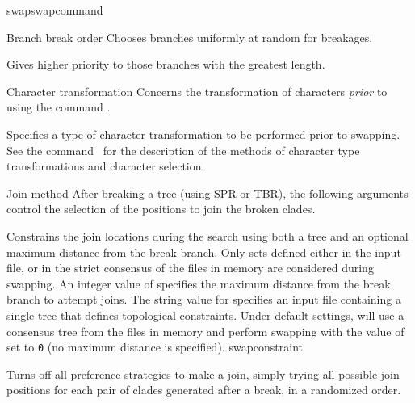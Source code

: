 \begin{command}{swap}{swapcommand}
\begin{arguments}
\begin{argumentgroup}{Branch break order}
                {Chooses branches uniformly at random for breakages.}
                {}

                {Gives higher priority to those branches with the greatest length.}
                {}

        \end{argumentgroup}


        \begin{argumentgroup}{Character transformation} 
        {Concerns the transformation of characters \emph{prior} to using the command 
        .}
	    
                {Specifies a type of character transformation to be performed
                prior to swapping.
                See the command~ for
                the description of the methods of character type transformations
                and character selection.}
                {}
        \end{argumentgroup}


        \begin{argumentgroup}{Join method}
            {After breaking a tree (using SPR or TBR), the following 
            arguments control the selection of the positions to join the broken
            clades.}

                {Constrains the join locations during the search
                using both a tree and an optional maximum distance from the
                break branch. Only sets defined either in the input file, or
                in the strict consensus of the files in memory are considered
                during swapping. An integer value of 
                specifies the maximum distance from the break branch to
                attempt joins. The string value for 
                specifies an input file containing a single tree that
                defines topological constraints. Under default settings,
                 will use a consensus tree from the
                files in memory and perform swapping with the value of
                 set to \texttt{0} (no maximum distance
                is specified).}
                {swapconstraint}

                {Turns off all preference strategies to make a join, simply trying
                all possible join positions for each pair of clades generated
                after a break, in a randomized order.}
                {}


\end{argumentgroup}
\end{arguments}
\end{command}
